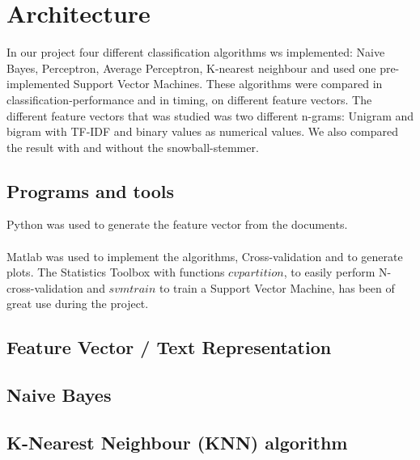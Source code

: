 \chapter{Architecture}
In our project four different classification algorithms ws implemented: Naive Bayes, Perceptron, Average Perceptron, K-nearest neighbour and used one pre-implemented Support Vector Machines. 
These algorithms were compared in classification-performance and in timing, on different feature vectors.
The different feature vectors that was studied was two different n-grams: Unigram and bigram with TF-IDF and binary values as numerical values. We also compared the result with and without the snowball-stemmer.
\section{Programs and tools}
Python was used to generate the feature vector from the documents.
\\\\
Matlab was used to implement the algorithms, Cross-validation and to generate plots. The Statistics Toolbox with functions $cvpartition$, to easily perform N-cross-validation and $svmtrain$ to train a Support Vector Machine, has been of great use during the project.

\section{Feature Vector / Text Representation}

\section{Naive Bayes}


\section{K-Nearest Neighbour (KNN) algorithm}


